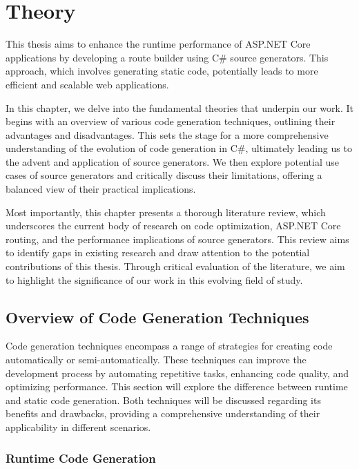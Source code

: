 \chapter{Theory}

This thesis aims to enhance the runtime performance of ASP.NET Core applications by developing a route builder using C\# source generators. This approach, which involves generating static code, potentially leads to more efficient and scalable web applications.

In this chapter, we delve into the fundamental theories that underpin our work. It begins with an overview of various code generation techniques, outlining their advantages and disadvantages. This sets the stage for a more comprehensive understanding of the evolution of code generation in C\#, ultimately leading us to the advent and application of source generators. We then explore potential use cases of source generators and critically discuss their limitations, offering a balanced view of their practical implications.

Most importantly, this chapter presents a thorough literature review, which underscores the current body of research on code optimization, ASP.NET Core routing, and the performance implications of source generators. This review aims to identify gaps in existing research and draw attention to the potential contributions of this thesis. Through critical evaluation of the literature, we aim to highlight the significance of our work in this evolving field of study.

\section{Overview of Code Generation Techniques}

Code generation techniques encompass a range of strategies for creating code automatically or semi-automatically. These techniques can improve the development process by automating repetitive tasks, enhancing code quality, and optimizing performance. This section will explore the difference between runtime and static code generation. Both techniques will be discussed regarding its benefits and drawbacks, providing a comprehensive understanding of their applicability in different scenarios.

\subsection{Runtime Code Generation}

